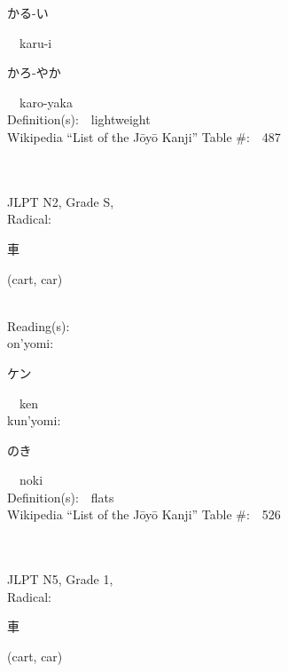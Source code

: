 \begin{multicols}{2}
{\hspace*{2em}}{\begin{CJK}{UTF8}{min} かる-い \end{CJK}}\ \ karu-i\ \ \\
{\hspace*{2em}}{\begin{CJK}{UTF8}{min} かろ-やか \end{CJK}}\ \ karo-yaka\ \ \\
Definition(s):\ \ lightweight \\
Wikipedia ``List of the J\=oy\=o Kanji'' Table \#:\ \ 487 \\
\ \ \\
{\fontsize{34pt}{40pt}  }\ \ \\  %
{JLPT N2, Grade S, \\Radical:\ \ {\begin{CJK}{UTF8}{min} 車 \end{CJK}} (cart, car) } \\
Reading(s):\ \ \\
{\hspace*{1em}}on'yomi:\ \ \\
{\hspace*{2em}}{\begin{CJK}{UTF8}{min} ケン \end{CJK}}\ \ ken\ \ \\
{\hspace*{1em}}kun'yomi:\ \ \\
{\hspace*{2em}}{\begin{CJK}{UTF8}{min} のき \end{CJK}}\ \ noki\ \ \\
Definition(s):\ \ flats \\
Wikipedia ``List of the J\=oy\=o Kanji'' Table \#:\ \ 526 \\
\ \ \\
{\fontsize{34pt}{40pt}  }\ \ \\  %
{JLPT N5, Grade 1, \\Radical:\ \ {\begin{CJK}{UTF8}{min} 車 \end{CJK}} (cart, car) } \\

\end{multicols}
